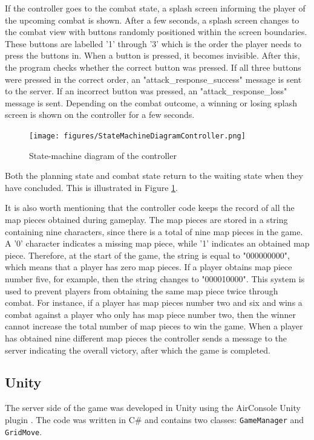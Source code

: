 If the controller goes to the combat state, a splash screen informing the player of the upcoming combat is shown. After a few seconds, a splash screen changes to the combat view with buttons randomly positioned within the screen boundaries. These buttons are labelled '1' through '3' which is the order the player needs to press the buttons in. When a button is pressed, it becomes invisible. After this, the program checks whether the correct button was pressed. If all three buttons were pressed in the correct order, an "attack\_response\_success" message is sent to the server. If an incorrect button was pressed, an "attack\_response\_loss" message is sent. Depending on the combat outcome, a winning or losing splash screen is shown on the controller for a few seconds. 

\begin{figure}
	\centering
	\texttt{[image: figures/StateMachineDiagramController.png]}
	\caption{State-machine diagram of the controller \label{fig:stateMachine}}
\end{figure}

Both the planning state and combat state return to the waiting state when they have concluded.  This is illustrated in Figure \ref{fig:stateMachine}.

It is also worth mentioning that the controller code keeps the record of all the map pieces obtained during gameplay. The map pieces are stored in a string containing nine characters, since there is a total of nine map pieces in the game. A '0' character indicates a missing map piece, while '1' indicates an obtained map piece. Therefore, at the start of the game, the string is equal to "000000000", which means that a player has zero map pieces. If a player obtains map piece number five, for example, then the string changes to "000010000". This system is used to prevent players from obtaining the same map piece twice through combat. For instance, if a player has map pieces number two and six and wins a combat against a player who only has map piece number two, then the winner cannot increase the total number of map pieces to win the game. When a player has obtained nine different map pieces the controller sends a message to the server indicating the overall victory, after which the game is completed. 

\subsection{Unity}
The server side of the game was developed in Unity using the AirConsole Unity plugin \cite{AirconsoleUnity}. The code was written in C\# and contains two classes: \texttt{GameManager} and \texttt{GridMove}.

